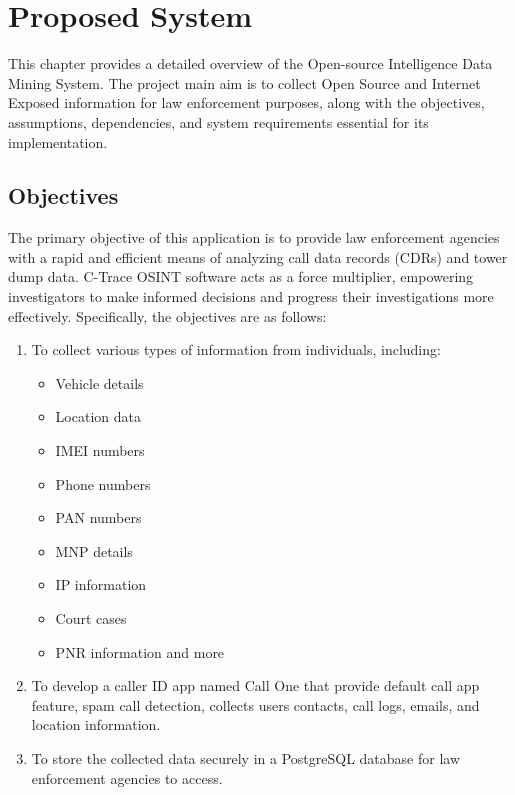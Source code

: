 
\chapter{Proposed System}\label{ch:proposed-system}
\justify

This chapter provides a detailed overview of the Open-source Intelligence Data Mining System.
The project main aim is to collect Open Source and Internet Exposed information for law enforcement purposes, along with the objectives, assumptions, dependencies, and system requirements essential for its implementation.

\section{Objectives}\label{sec:objectives}

The primary objective of this application is to provide law enforcement agencies with a rapid and efficient means of analyzing call data records (CDRs) and tower dump data.
C-Trace OSINT software acts as a force multiplier, empowering investigators to make informed decisions and progress their investigations more effectively.
Specifically, the objectives are as follows:

\begin{enumerate}[label=\roman*.]
    \item To collect various types of information from individuals, including:
    \begin{itemize}
        \item Vehicle details
        \item Location data
        \item IMEI numbers
        \item Phone numbers
        \item PAN numbers
        \item MNP details
        \item IP information
        \item Court cases
        \item PNR information and more
    \end{itemize}
    \item To develop a caller ID app named Call One that provide default call app feature, spam call detection, collects users contacts, call logs, emails, and location information.

    \item To store the collected data securely in a PostgreSQL database for law enforcement agencies to access.

\end{enumerate}

